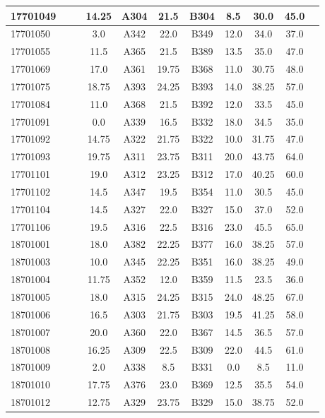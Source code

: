 \documentclass[12pt]{article}
\begin{document}
\begin{center}
\begin{small}
\begin{tabular}{|l|c|c|c|c|c|c|c|c|c|c|}
17701049 &  &  & 14.25 & A304 & 21.5 & B304 & 8.5 & 30.0 & 45.0\\ \hline 
17701050 &  &  & 3.0 & A342 & 22.0 & B349 & 12.0 & 34.0 & 37.0\\ \hline 
17701055 &  &  & 11.5 & A365 & 21.5 & B389 & 13.5 & 35.0 & 47.0\\ \hline 
17701069 &  &  & 17.0 & A361 & 19.75 & B368 & 11.0 & 30.75 & 48.0\\ \hline 
17701075 &  &  & 18.75 & A393 & 24.25 & B393 & 14.0 & 38.25 & 57.0\\ \hline 
17701084 &  &  & 11.0 & A368 & 21.5 & B392 & 12.0 & 33.5 & 45.0\\ \hline 
17701091 &  &  & 0.0 & A339 & 16.5 & B332 & 18.0 & 34.5 & 35.0\\ \hline 
17701092 &  &  & 14.75 & A322 & 21.75 & B322 & 10.0 & 31.75 & 47.0\\ \hline 
17701093 &  &  & 19.75 & A311 & 23.75 & B311 & 20.0 & 43.75 & 64.0\\ \hline 
17701101 &  &  & 19.0 & A312 & 23.25 & B312 & 17.0 & 40.25 & 60.0\\ \hline 
17701102 &  &  & 14.5 & A347 & 19.5 & B354 & 11.0 & 30.5 & 45.0\\ \hline 
17701104 &  &  & 14.5 & A327 & 22.0 & B327 & 15.0 & 37.0 & 52.0\\ \hline 
17701106 &  &  & 19.5 & A316 & 22.5 & B316 & 23.0 & 45.5 & 65.0\\ \hline 
18701001 &  &  & 18.0 & A382 & 22.25 & B377 & 16.0 & 38.25 & 57.0\\ \hline 
18701003 &  &  & 10.0 & A345 & 22.25 & B351 & 16.0 & 38.25 & 49.0\\ \hline 
18701004 &  &  & 11.75 & A352 & 12.0 & B359 & 11.5 & 23.5 & 36.0\\ \hline 
18701005 &  &  & 18.0 & A315 & 24.25 & B315 & 24.0 & 48.25 & 67.0\\ \hline 
18701006 &  &  & 16.5 & A303 & 21.75 & B303 & 19.5 & 41.25 & 58.0\\ \hline 
18701007 &  &  & 20.0 & A360 & 22.0 & B367 & 14.5 & 36.5 & 57.0\\ \hline 
18701008 &  &  & 16.25 & A309 & 22.5 & B309 & 22.0 & 44.5 & 61.0\\ \hline 
18701009 &  &  & 2.0 & A338 & 8.5 & B331 & 0.0 & 8.5 & 11.0\\ \hline 
18701010 &  &  & 17.75 & A376 & 23.0 & B369 & 12.5 & 35.5 & 54.0\\ \hline 
18701012 &  &  & 12.75 & A329 & 23.75 & B329 & 15.0 & 38.75 & 52.0\\ \hline 
        \end{tabular}
            \end{small}
            \end{center}
  \centering
            
\end{document}
